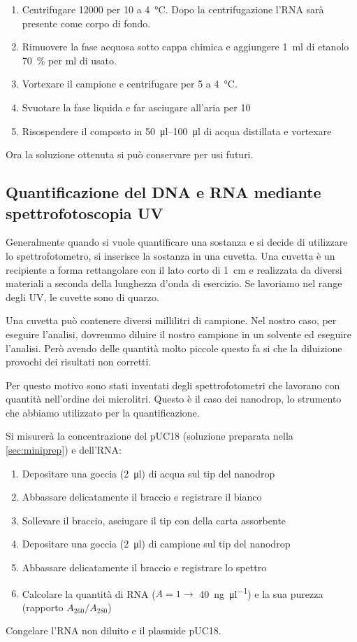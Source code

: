 \begin{enumerate}
	\item Centrifugare \qty{12000}{\giri} per \qty{10}{\min} a \qty{4}{\celsius}. Dopo la centrifugazione l’RNA sarà presente come corpo di fondo.
	\item Rimuovere la fase acquosa sotto cappa chimica e aggiungere \qty{1}{ml} di etanolo \qty{70}{\percent} per \unit{\ml} di \trizol usato.
	\item Vortexare il campione e centrifugare per \qty{5}{\min} a \qty{4}{\celsius}.
	\item Svuotare la fase liquida e far asciugare all’aria per \qty{10}{\min}
	\item Risospendere il composto in \qtyrange{50}{100}{\micro\litre} di acqua distillata e vortexare
\end{enumerate}
Ora la soluzione ottenuta si può conservare per usi futuri.

\subsection{Quantificazione del DNA e RNA mediante spettrofotoscopia UV}
\begin{Informazione}
	Generalmente quando si vuole quantificare una sostanza e si decide di utilizzare lo spettrofotometro, si inserisce la sostanza in una cuvetta. Una cuvetta è un recipiente a forma rettangolare con il lato corto di \qty{1}{cm} e realizzata da diversi materiali a seconda della lunghezza d'onda di esercizio. Se lavoriamo nel range degli UV, le cuvette sono di quarzo.

	Una cuvetta può contenere diversi millilitri di campione. Nel nostro caso, per eseguire l'analisi, dovremmo diluire il nostro campione in un solvente ed eseguire l'analisi. Però avendo delle quantità molto piccole questo fa si che la diluizione provochi dei risultati non corretti.

	Per questo motivo sono stati inventati degli spettrofotometri che lavorano con quantità nell'ordine dei microlitri. Questo è il caso dei nanodrop, lo strumento che abbiamo utilizzato per la quantificazione.
\end{Informazione}

\noindent Si misurerà la concentrazione del pUC18 (soluzione preparata nella \autoref{sec:miniprep}) e dell'RNA:
\begin{enumerate}
	\item Depositare una goccia (\qty{2}{\micro\litre}) di acqua sul tip del nanodrop
	\item Abbassare delicatamente il braccio e registrare il bianco
	\item Sollevare il braccio, asciugare il tip con della carta assorbente
	\item Depositare una goccia (\qty{2}{\micro\litre}) di campione sul tip del nanodrop
	\item Abbassare delicatamente il braccio e registrare lo spettro
	\item Calcolare la quantità di RNA (\(A=1\to\) \qty{40}{\ng\per\micro\litre}) e la sua purezza (rapporto \(A_{260}/A_{280}\))
\end{enumerate}
Congelare l'RNA non diluito e il plasmide pUC18.

